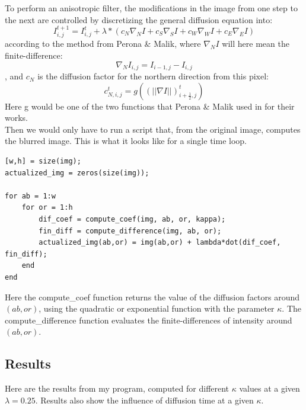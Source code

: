 \documentclass[12pt,a4paper]{article}
\begin{document}
To perform an anisotropic filter, the modifications in the image from one step to the next are controlled by discretizing the general diffusion equation into:
\begin{equation}
I_{i,j}^{t+1} = I_{i,j}^{t} + \lambda * (c_{N} \nabla_{N}I + c_{S} \nabla_{S}I + c_{W} \nabla_{W}I + c_{E} \nabla_{E}I)
\end{equation}
according to the method from Perona \& Malik,
where $\nabla_{N}I$ will here mean the finite-difference:
\begin{equation}
\nabla_{N}I_{i,j} = I_{i-1,j} - I_{i,j}
\end{equation} , and $c_{N}$ is the diffusion factor for the northern direction from this pixel: 
\begin{equation}
c_{N,i,j}^{t} = g((||\nabla I||)_{i+\frac{1}{2},j}^{t})
\end{equation}
Here g would be one of the two functions that Perona \& Malik used in for their works.
\\
Then we would only have to run a script that, from the original image, computes the blurred image. This is what it looks like for a single time loop.
\begin{lstlisting}
[w,h] = size(img);
actualized_img = zeros(size(img));

for ab = 1:w
	for or = 1:h
		dif_coef = compute_coef(img, ab, or, kappa);
		fin_diff = compute_difference(img, ab, or);
		actualized_img(ab,or) = img(ab,or) + lambda*dot(dif_coef, fin_diff);
	end
end
\end{lstlisting}
Here the compute\_coef function returns the value of the diffusion factors around $(ab,or)$, using the quadratic or exponential function with the parameter $\kappa$.
The compute\_difference function evaluates the finite-differences of intensity around $(ab,or)$.

\subsection{Results}

Here are the results from my program, computed for different $\kappa$ values at a given $\lambda=0.25$. Results also show the influence of diffusion time at a given $\kappa$.
\end{document}
